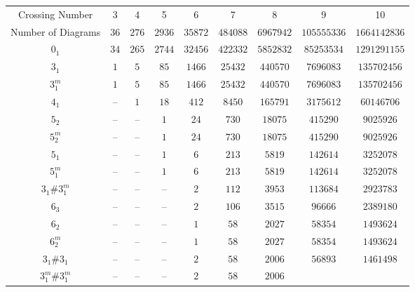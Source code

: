 \documentclass[amsmath,secnumarabic,amssymb,floatfix,nofootinbib,nobibnotes,letterpaper,11pt,tightenlines,showkeys]{revtex4}
\theoremstyle{definition}
\begin{document}
\begin{table}[H]
\begin{ruledtabular}
\begin{tabular}{ccccccccc}
Crossing Number &
3 & 4 & 5 & 6 & 7 & 8 & 9 & 10 \\
Number of Diagrams &
$\num{36}$ &
$\num{276}$ &
$\num{2936}$ &
$\num{35872}$ &
$\num{484088}$ &
$\num{6967942}$ &
$\num{105555336}$ &
$\num{1664142836}$\\ \hline
$0_1$ &
$\num{34}$ &
$\num{265}$ &
$\num{2744}$ &
$\num{32456}$ &
$\num{422332}$ &
$\num{5852832}$ &
$\num{85253534}$ &
$\num{1291291155}$\\
$3_{1}^{}$ &
$\num{1}$ &
$\num{5}$ &
$\num{85}$ &
$\num{1466}$ &
$\num{25432}$ &
$\num{440570}$ &
$\num{7696083}$ &
$\num{135702456}$\\
$3_{1}^{m}$ &
$\num{1}$ &
$\num{5}$ &
$\num{85}$ &
$\num{1466}$ &
$\num{25432}$ &
$\num{440570}$ &
$\num{7696083}$ &
$\num{135702456}$\\
$4_{1}^{}$ &
-- &
$\num{1}$ &
$\num{18}$ &
$\num{412}$ &
$\num{8450}$ &
$\num{165791}$ &
$\num{3175612}$ &
$\num{60146706}$\\
$5_{2}^{}$ &
-- &
-- &
$\num{1}$ &
$\num{24}$ &
$\num{730}$ &
$\num{18075}$ &
$\num{415290}$ &
$\num{9025926}$\\
$5_{2}^{m}$ &
-- &
-- &
$\num{1}$ &
$\num{24}$ &
$\num{730}$ &
$\num{18075}$ &
$\num{415290}$ &
$\num{9025926}$\\
$5_{1}^{}$ &
-- &
-- &
$\num{1}$ &
$\num{6}$ &
$\num{213}$ &
$\num{5819}$ &
$\num{142614}$ &
$\num{3252078}$\\
$5_{1}^{m}$ &
-- &
-- &
$\num{1}$ &
$\num{6}$ &
$\num{213}$ &
$\num{5819}$ &
$\num{142614}$ &
$\num{3252078}$\\
$3_{1}^{}\#3_{1}^{m}$ &
-- &
-- &
-- &
$\num{2}$ &
$\num{112}$ &
$\num{3953}$ &
$\num{113684}$ &
$\num{2923783}$\\
$6_{3}^{}$ &
-- &
-- &
-- &
$\num{2}$ &
$\num{106}$ &
$\num{3515}$ &
$\num{96666}$ &
$\num{2389180}$\\
$6_{2}^{}$ &
-- &
-- &
-- &
$\num{1}$ &
$\num{58}$ &
$\num{2027}$ &
$\num{58354}$ &
$\num{1493624}$\\
$6_{2}^{m}$ &
-- &
-- &
-- &
$\num{1}$ &
$\num{58}$ &
$\num{2027}$ &
$\num{58354}$ &
$\num{1493624}$\\
$3_{1}^{}\#3_{1}^{}$ &
-- &
-- &
-- &
$\num{2}$ &
$\num{58}$ &
$\num{2006}$ &
$\num{56893}$ &
$\num{1461498}$\\
$3_{1}^{m}\#3_{1}^{m}$ &
-- &
-- &
-- &
$\num{2}$ &
$\num{58}$ &
$\num{2006}$ &

\end{tabular}
\end{ruledtabular}
\end{table}
\end{document}
